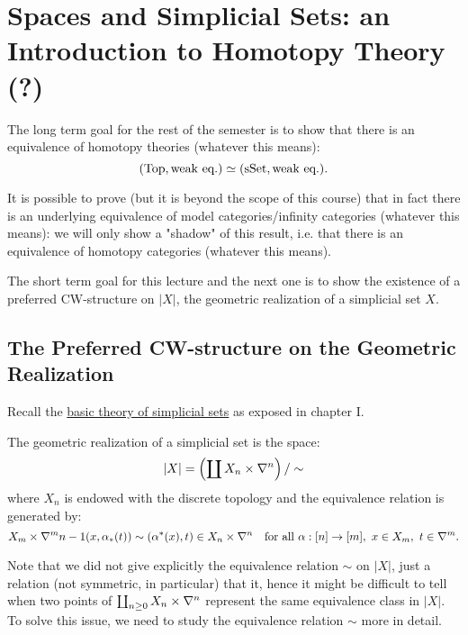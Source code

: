 
\chapter{Spaces and Simplicial Sets: an Introduction to Homotopy Theory (?)}\label{chapter:the-cool-chapter}


The long term goal for the rest of the semester is to show that there is an equivalence of homotopy theories (whatever this means):
\[({\mathrm{Top}},\text{weak eq.})\simeq({\mathrm{sSet}},\text{weak eq.}).\]

It is possible to prove (but it is beyond the scope of this course) that in fact there is an underlying equivalence of model categories/infinity categories (whatever this means): we will only show a "shadow" of this result, i.e. that there is an equivalence of homotopy categories (whatever this means).

The short term goal for this lecture and the next one is to show the existence of a preferred CW-structure on $|X|$, the geometric realization of a simplicial set $X$.

\section{The Preferred CW-structure on the Geometric Realization}
Recall the \hyperref[section:reminder-on-sset]{basic theory of simplicial sets} as exposed in chapter I.

The geometric realization of a simplicial set is the space:
\[|X|=\left(\coprod X_n\times\nabla^n\right)/\sim\]
where $X_n$ is endowed with the discrete topology and the equivalence relation is generated by:
\[X_m\times\nabla^m\cont(x,\alpha_*(t))\sim(\alpha^*(x),t)\in X_n\times\nabla^n\quad\text{for all }\alpha:[n]\to[m],\ x\in X_m,\ t\in\nabla^m.\]

Note that we did not give explicitly the equivalence relation $\sim$ on $|X|$, just a relation (not symmetric, in particular) that  it,
hence it might be difficult to tell when two points of $\coprod_{n\ge0} X_n\times\nabla^n$ represent the same equivalence class in $|X|$.
To solve this issue, we need to study the equivalence relation $\sim$ more in detail.

